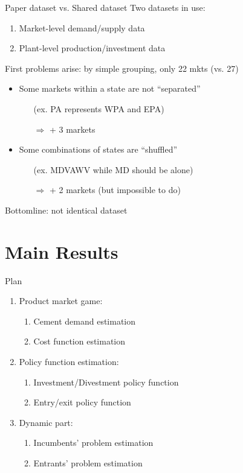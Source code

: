 \documentclass[12pt]{beamer}
\begin{document}
\begin{frame}{Paper dataset vs. Shared dataset}
Two datasets in use:\begin{enumerate}
\item Market-level demand/supply data
\item Plant-level production/investment data
\item[]
\end{enumerate}
First problems arise: by simple grouping, only 22 mkts (vs. 27)
\begin{itemize}
\item Some markets within a state are not ``separated''
\begin{itemize}
\item[](ex. PA represents WPA and EPA)
\item[$\Rightarrow$] + 3 markets
\end{itemize}
\item Some combinations of states are ``shuffled''
\begin{itemize}
\item[](ex. MDVAWV while MD should be alone)
\item[$\Rightarrow$] + 2 markets (but impossible to do)
\end{itemize}
\end{itemize}
\begin{center}
Bottomline: not identical dataset
\end{center}
\end{frame}


\section{Main Results}

\begin{frame}{Plan}
\begin{enumerate}
\item Product market game:
\begin{enumerate}
\item Cement demand estimation
\item Cost function estimation
\item[]
\end{enumerate}
\item Policy function estimation:
\begin{enumerate}
\item Investment/Divestment policy function
\item Entry/exit policy function
\item[]
\end{enumerate}
\item Dynamic part:
\begin{enumerate}
\item Incumbents' problem estimation
\item Entrants' problem estimation
\end{enumerate}
\end{enumerate}
\end{frame}
\end{document}
